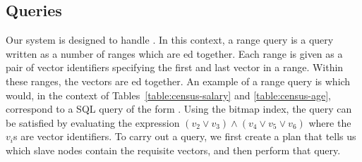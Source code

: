 \subsection{Queries}
Our system is designed to handle . In this context, a range
query is a query written as a number of ranges which are ed together.
Each range is given as a pair of vector identifiers specifying the first and
last vector in a range. Within these ranges, the vectors are ed
together. An example of a range query is  which would,
in the context of Tables~\ref{table:census-salary} and \ref{table:census-age},
correspond to a SQL query of the form
.
Using the bitmap index, the query can be satisfied by evaluating the expression
\((v_2 \lor v_3) \land (v_4 \lor v_5 \lor v_6)\) where the \(v_i\)s are vector identifiers.
To carry out a query, we first create a plan that tells us which slave nodes
contain the requisite vectors, and then perform that query.
%
